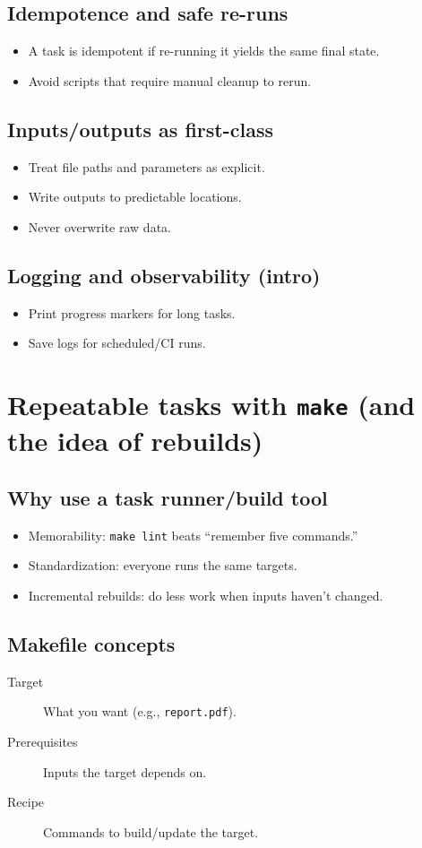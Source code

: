 \subsection{Idempotence and safe re-runs}
\begin{itemize}
\item A task is idempotent if re-running it yields the same final state.
\item Avoid scripts that require manual cleanup to rerun.
\end{itemize}

\subsection{Inputs/outputs as first-class}
\begin{itemize}
\item Treat file paths and parameters as explicit.
\item Write outputs to predictable locations.
\item Never overwrite raw data.
\end{itemize}

\subsection{Logging and observability (intro)}
\begin{itemize}
\item Print progress markers for long tasks.
\item Save logs for scheduled/CI runs.
\end{itemize}

\section{Repeatable tasks with \texttt{make} (and the idea of rebuilds)}
\subsection{Why use a task runner/build tool}
\begin{itemize}
\item Memorability: \texttt{make lint} beats ``remember five commands.''
\item Standardization: everyone runs the same targets.
\item Incremental rebuilds: do less work when inputs haven't changed.
\end{itemize}

\subsection{Makefile concepts}
\begin{description}
\item[Target] What you want (e.g., \texttt{report.pdf}).
\item[Prerequisites] Inputs the target depends on.
\item[Recipe] Commands to build/update the target.
\end{description}

